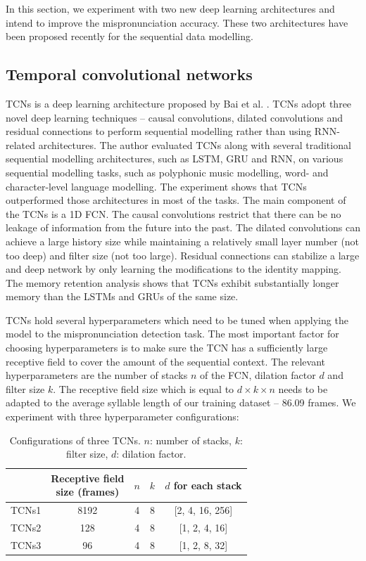 In this section, we experiment with two new deep learning architectures and intend to improve the mispronunciation accuracy. These two architectures have been proposed recently for the sequential data modelling.

\subsection{Temporal convolutional networks}

\gls{TCNs} is a deep learning architecture proposed by Bai et al. \cite{Bai2018}. \gls{TCNs} adopt three novel deep learning techniques -- causal convolutions, dilated convolutions and residual connections to perform sequential modelling rather than using \gls{RNN}-related architectures. The author evaluated \gls{TCNs} along with several traditional sequential modelling architectures, such as \gls{LSTM}, \gls{GRU} and \gls{RNN}, on various sequential modelling tasks, such as polyphonic music modelling, word- and character-level language modelling. The experiment shows that \gls{TCNs} outperformed those architectures in most of the tasks. The main component of the \gls{TCNs} is a 1D \gls{FCN}. The causal convolutions restrict that there can be no leakage of information from the future into the past. The dilated convolutions can achieve a large history size while maintaining a relatively small layer number (not too deep) and filter size (not too large). Residual connections can stabilize a large and deep network by only learning the modifications to the identity mapping. The memory retention analysis shows that \gls{TCNs} exhibit substantially longer memory than the \gls{LSTM}s and \gls{GRU}s of the same size.

\gls{TCNs} hold several hyperparameters which need to be tuned when applying the model to the mispronunciation detection task. The most important factor for choosing hyperparameters is to make sure the TCN has a sufficiently large receptive field to cover the amount of the sequential context. The relevant hyperparameters are the number of stacks $n$ of the \gls{FCN}, dilation factor $d$ and filter size $k$. The receptive field size which is equal to $d\times k \times n$ needs to be adapted to the average syllable length of our training dataset -- 86.09 frames. We experiment with three hyperparameter configurations:

\begin{table}[ht!]
\centering
\caption{Configurations of three TCNs. $n$: number of stacks, $k$: filter size, $d$: dilation factor.}
\label{tab:ch6:tcns_configurations}
\begin{tabular}{ccccc}
\toprule
& \makecell[c]{Receptive field\\size (frames)} & $n$ & $k$ & $d$ for each stack \\
\midrule
TCNs1 & 8192 & 4 & 8 & [2, 4, 16, 256] \\
TCNs2 & 128 & 4 & 8 & [1, 2, 4, 16] \\
TCNs3 & 96 & 4 & 8 & [1, 2, 8, 32] \\
\bottomrule
\end{tabular}
\end{table}

